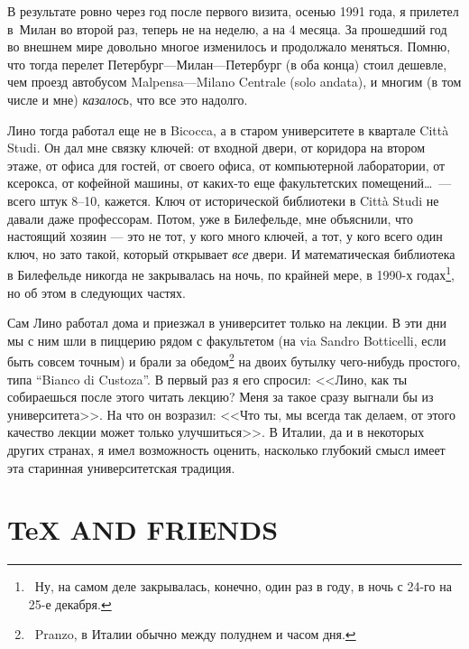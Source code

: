 \documentclass[intlimits,twoside,a4paper,11pt]{article}
\begin{document}
	В результате ровно через год после первого визита, осенью 1991 года, я прилетел 
	в~Милан во второй раз, теперь не на неделю, а на 4 месяца. За прошедший год во 
	внешнем мире довольно многое изменилось и продолжало меняться. Помню, что
	тогда перелет Петербург---Милан---Петербург (в оба конца) стоил дешевле, чем
	проезд автобусом Malpensa---Milano Centrale (solo andata), и многим (в том числе и 
	мне) {\it казалось\/}, что все это надолго.
	
	Лино тогда работал еще
	не в Bicocca, а в старом университете в квартале Citt\`a Studi. Он дал мне 
	связку ключей: от входной двери, от коридора на втором этаже, от офиса для
	гостей, от своего офиса, от компьютерной лаборатории, от ксерокса, от кофейной 
	машины, от каких-то еще факультетских 
	помещений\ldots \, --- всего штук 8--10, кажется. Ключ от исторической библиотеки в
	Citt\`a Studi не давали даже профессорам.
	Потом, уже в Билефельде, мне объяснили, 
	что настоящий хозяин --- это не тот, у кого много ключей, а тот, у кого всего один 
	ключ, но зато такой, который открывает {\it все\/} двери. И математическая 
	библиотека в Билефельде никогда не закрывалась на ночь, по крайней мере, в 
	1990-х годах\footnote{~Ну, на самом деле закрывалась, конечно, один раз в году, 
		в ночь с 24-го на 25-е декабря.}, но об этом в следующих частях.
	
	Сам Лино работал дома и приезжал в университет только на лекции. В эти дни 
	мы с ним шли в пиццерию рядом с факультетом (на via Sandro Botticelli, если быть
	совсем точным) и брали за обедом\footnote{~Pranzo, в
		Италии обычно между полуднем и часом дня.} на двоих бутылку 
	чего-нибудь простого, типа ``Bianco di Custoza''. В первый раз я его спросил: 
	<<Лино, как ты собираешься после этого читать лекцию? Меня за такое сразу
	выгнали бы из университета>>. На что он возразил: <<Что ты, мы всегда так
	делаем, от этого качество лекции может только улучшиться>>. В Италии, 
	да и в некоторых других странах, я имел возможность оценить, насколько глубокий 
	смысл имеет эта старинная университетская традиция. 
	
	
	\section{{\TeX} AND FRIENDS}
	
\end{document}
